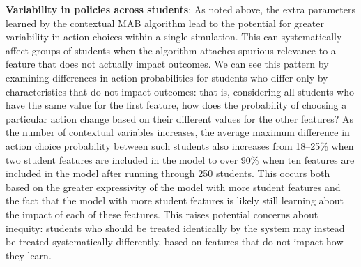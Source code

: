 

\textbf{Variability in policies across students}:
As noted above, the extra parameters learned by the contextual MAB algorithm lead to the potential for greater variability in action choices within a single simulation. This can systematically affect groups of students when the algorithm attaches spurious relevance to a feature that does not actually impact outcomes. We can see this pattern by examining differences in action probabilities for students who differ only by characteristics that do not impact outcomes: that is, considering all students who have the same value for the first feature, how does the probability of choosing a particular action change based on their different values for the other features?
As the number of contextual variables increases, the average maximum difference in action choice probability between such students also increases from 18--25\% when two student features are included in the model to over 90\% when ten features are included in the model after running through 250 students. This occurs both based on the greater expressivity of the model with more student features and the fact that the model with more student features is likely still learning about the impact of each of these features.
This raises potential concerns about inequity: students who should be treated identically by the system may instead be treated systematically differently, based on features that do not impact how they learn.




